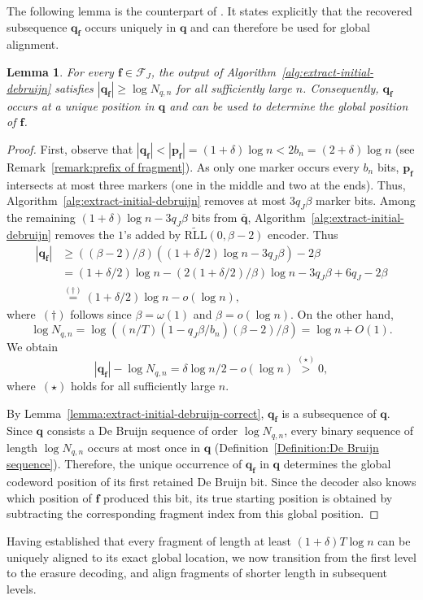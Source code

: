 \documentclass[journal,letterpaper,onecolumn,11pt]{IEEEtran}
\newcommand{\cF}{\mathcal{F}}
\newcommand{\boldf}{\mathbf{f}}
\newcommand{\boldp}{\mathbf{p}}
\newcommand{\boldq}{\mathbf{q}}
\newtheorem{lemma}{Lemma}
\begin{document}
The following lemma is the counterpart of
\cite[Lemma~8]{liu2026improved}. 
It states explicitly that the recovered subsequence \(\boldq_{\boldf}\)
occurs uniquely in \(\boldq\) and can therefore be used for global
alignment.

\begin{lemma}\label{lemma:initial-debruijn-long-enough}
For every \(\boldf\in\cF_J\), the output of
Algorithm~\ref{alg:extract-initial-debruijn} satisfies
\(|\boldq_{\boldf}|\geq\log N_{q,n}\) for all sufficiently large \(n\).
Consequently, \(\boldq_{\boldf}\) occurs at a unique position in
\(\boldq\) and can be used to determine the global position of
\(\boldf\).
\end{lemma}

\begin{proof}
First, observe that
\(|\boldq_{\boldf}|<|\boldp_{\boldf}|=(1+\delta)\log n<2b_n=(2+\delta)\log n\) (see Remark~\ref{remark:prefix of fragment}). 
As only one marker occurs every $b_n$ bits,
\(\boldp_{\boldf}\)  intersects at most three markers (one in the middle and two at the ends).
Thus, Algorithm~\ref{alg:extract-initial-debruijn} removes at most
\(3q_J\beta\) marker bits.
Among the remaining \((1+\delta)\log n-3q_J\beta\) bits from
\(\bar{\boldq}\), Algorithm~\ref{alg:extract-initial-debruijn} removes the $1$'s added by $\widetilde{\text{RLL}}(0,\beta-2)$ encoder. 
Thus
\begin{align*}
    |\boldq_{\boldf}|&\geq((\beta-2)/\beta)((1+\delta/2)\log n-3q_J\beta)-2\beta\\
&=(1+\delta/2)\log n-(2(1+\delta/2)/\beta)\log n-3q_J\beta+6q_J-2\beta\\
&\overset{(\dagger)}{=}(1+\delta/2)\log n-o(\log n),
\end{align*}
where~$(\dagger)$ follows since $\beta=\omega(1)$ and $\beta=o(\log n)$.
On the other hand,
$$\log N_{q,n}=\log ((n/T)(1-q_J\beta/b_n)(\beta-2)/\beta)
=\log n+O(1).$$
 We
obtain
$$|\boldq_{\boldf}|-\log N_{q,n}
=\delta\log n/2-o(\log n)\overset{(\star)}{>}0,$$
where~$(\star)$ holds for all sufficiently large \(n\).

By Lemma~\ref{lemma:extract-initial-debruijn-correct},
\(\boldq_{\boldf}\) is a subsequence of \(\boldq\). Since
\(\boldq\) consists a De Bruijn sequence of order \(\log N_{q,n}\), every
binary sequence of length \(\log N_{q,n}\) occurs at most once in
\(\boldq\) (Definition~\ref{Definition:De Bruijn sequence}). 
Therefore, the unique occurrence of \(\boldq_{\boldf}\) in \(\boldq\)
determines the global codeword position of its first retained De Bruijn
bit. 
Since the decoder also knows which position of \(\boldf\) produced
this bit, its true starting position is obtained by subtracting the
corresponding fragment index from this global position.
\end{proof}
Having established that every fragment of length at least $(1+\delta)T\log n$ can be uniquely aligned to its exact global location, we now transition from the first level to the erasure decoding, and align fragments of shorter length in subsequent levels.
\end{document}
